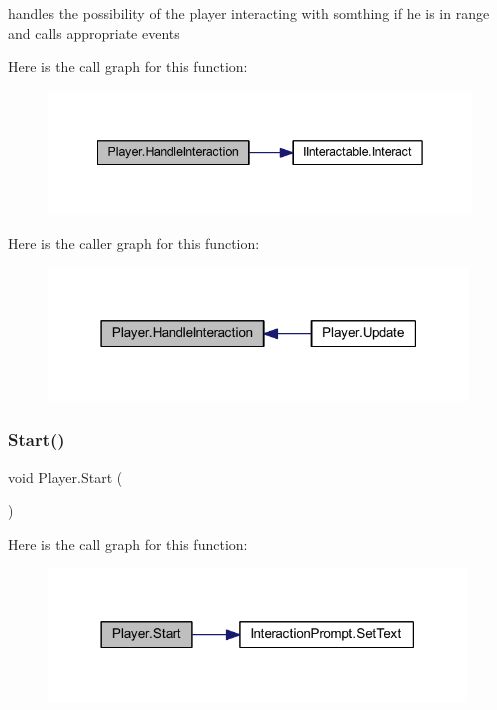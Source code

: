 handles the possibility of the player interacting with somthing if he is in range and calls appropriate events 

Here is the call graph for this function\+:\nopagebreak
\begin{figure}[H]
\begin{center}
\leavevmode
\includegraphics[width=342pt]{class_player_a377a703ca99ceaf80d62874b2585c745_cgraph}
\end{center}
\end{figure}
Here is the caller graph for this function\+:\nopagebreak
\begin{figure}[H]
\begin{center}
\leavevmode
\includegraphics[width=316pt]{class_player_a377a703ca99ceaf80d62874b2585c745_icgraph}
\end{center}
\end{figure}
\mbox{\label{class_player_a1a09a3ded16ac1646f6bdd4f25fe0ddd}} 
\subsubsection{\texorpdfstring{Start()}{Start()}}
{\footnotesize\ttfamily void Player.\+Start (\begin{DoxyParamCaption}{ }\end{DoxyParamCaption})\hspace{0.3cm}{\ttfamily [private]}}

Here is the call graph for this function\+:\nopagebreak
\begin{figure}[H]
\begin{center}
\leavevmode
\includegraphics[width=314pt]{class_player_a1a09a3ded16ac1646f6bdd4f25fe0ddd_cgraph}
\end{center}
\end{figure}
\mbox{\label{class_player_aace80372e18e32fe177e295fe5d93ba8}} 
